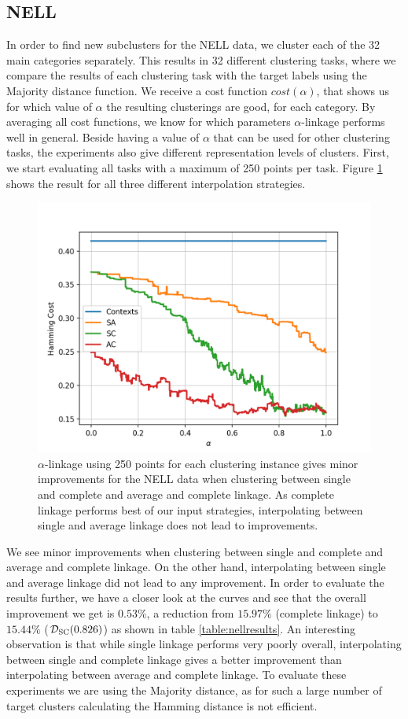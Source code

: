 \subsection{NELL}

In order to find new subclusters for the NELL data, we cluster each of the 32 main categories separately. This results in 32 different clustering tasks, where we compare the results of each clustering task with the target labels using the Majority distance function. We receive a cost function $cost(\alpha)$, that shows us for which value of $\alpha$ the resulting clusterings are good, for each category. By averaging all cost functions, we know for which parameters $\alpha$-linkage performs well in general. Beside having a value of $\alpha$ that can be used for other clustering tasks, the experiments also give different representation levels of clusters. First, we start evaluating all tasks with a maximum of 250 points per task. Figure \ref{fig:nellresults} shows the result for all three different interpolation strategies.

\begin{figure}[h]
\centering
  \includegraphics[width=.5\linewidth]{plots/nell_250}
\caption{$\alpha$-linkage using 250 points for each clustering instance gives minor improvements for the NELL data when clustering between single and complete and average and complete linkage. As complete linkage performs best of our input strategies, interpolating between single and average linkage does not lead to improvements.}
\label{fig:nellresults}
\end{figure}

We see minor improvements when clustering between single and complete and average and complete linkage. On the other hand, interpolating between single and average linkage did not lead to any improvement. In order to evaluate the results further, we have a closer look at the curves and see that the overall improvement we get is $0.53\%$, a reduction from $15.97\%$ (complete linkage) to $15.44\%$ ($\mathcal{D}_\text{SC}(0.826)$) as shown in table \ref{table:nellresults}. An interesting observation is that while single linkage performs very poorly overall, interpolating between single and complete linkage gives a better improvement than interpolating between average and complete linkage. To evaluate these experiments we are using the Majority distance, as for such a large number of target clusters calculating the Hamming distance is not efficient. 

